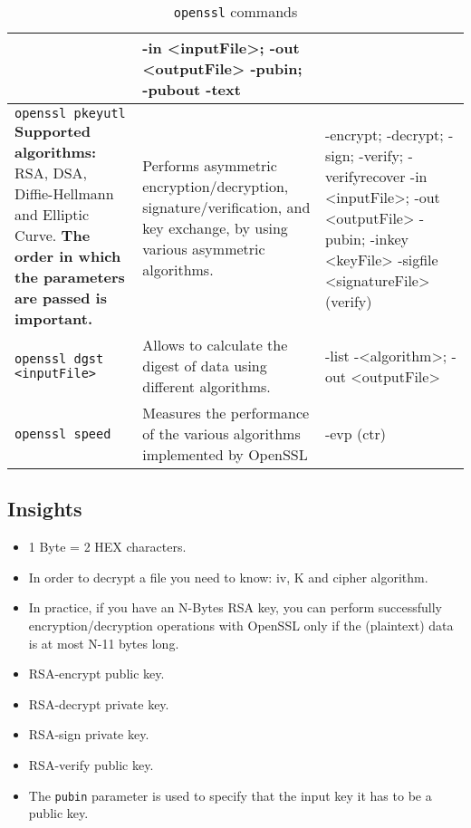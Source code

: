 \begin{table}[H]
\begin{tabular}{|p{6cm}|p{3cm}|p{7cm}|}
			& -in <inputFile>; -out <outputFile>
				\newline -pubin; -pubout
				\newline -text
			\\ \hline
		\texttt{openssl pkeyutl} 
			\newline\newline \textbf{Supported algorithms:} RSA, DSA, Diffie-Hellmann and Elliptic Curve. \textbf{The order in which the parameters are passed is important.}
			& Performs asymmetric encryption/decryption, signature/verification, and key exchange, by using various asymmetric algorithms.
			& -encrypt; -decrypt; -sign; 
				\newline -verify; -verifyrecover
				\newline -in <inputFile>; -out <outputFile>
				\newline -pubin; -inkey <keyFile>
				\newline -sigfile <signatureFile> (verify)
			\\ \hline
		\texttt{openssl dgst <inputFile>} 
			& Allows to calculate the digest of data using different algorithms.  
			& -list
				\newline -<algorithm>; -out <outputFile>
			\\ \hline
		\texttt{openssl speed} 
			& Measures the performance of the various algorithms implemented by OpenSSL
			& -evp (ctr)
			\\ \hline
    \end{tabular}

    \caption{\texttt{openssl} commands}

    \label{tab:openssl}
\end{table}

\clearpage
\subsection*{Insights}
\begin{itemize}
\item 1 Byte = 2 HEX characters. 
\item In order to decrypt a file you need to know: iv, K and cipher algorithm.
\item In practice, if you have an N-Bytes RSA key, you can perform successfully encryption/decryption operations with OpenSSL only if the (plaintext) data is at most N-11 bytes long.
\item RSA-encrypt \textrightarrow public key.
\item RSA-decrypt \textrightarrow private key.
\item RSA-sign \textrightarrow private key.
\item RSA-verify \textrightarrow public key.
\item The \texttt{pubin} parameter is used to specify that the input key it has to be a public key.
\end{itemize}

